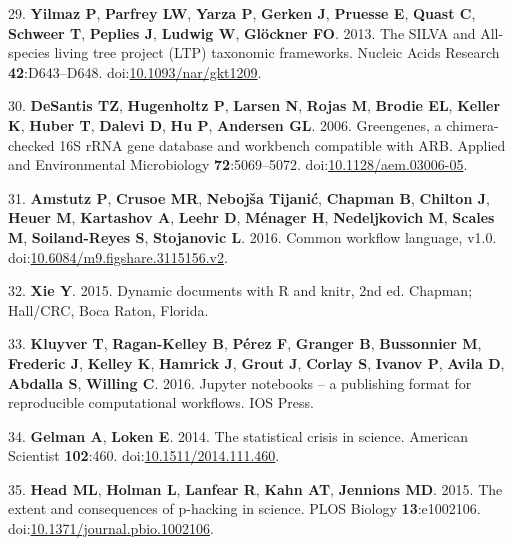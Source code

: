 \documentclass[]{article}
\begin{document}
\hypertarget{ref-Yilmaz2013}{}
29. \textbf{Yilmaz P}, \textbf{Parfrey LW}, \textbf{Yarza P},
\textbf{Gerken J}, \textbf{Pruesse E}, \textbf{Quast C}, \textbf{Schweer
T}, \textbf{Peplies J}, \textbf{Ludwig W}, \textbf{Glöckner FO}. 2013.
The SILVA and All-species living tree project (LTP) taxonomic
frameworks. Nucleic Acids Research \textbf{42}:D643--D648.
doi:\href{https://doi.org/10.1093/nar/gkt1209}{10.1093/nar/gkt1209}.

\hypertarget{ref-DeSantis2006}{}
30. \textbf{DeSantis TZ}, \textbf{Hugenholtz P}, \textbf{Larsen N},
\textbf{Rojas M}, \textbf{Brodie EL}, \textbf{Keller K}, \textbf{Huber
T}, \textbf{Dalevi D}, \textbf{Hu P}, \textbf{Andersen GL}. 2006.
Greengenes, a chimera-checked 16S rRNA gene database and workbench
compatible with ARB. Applied and Environmental Microbiology
\textbf{72}:5069--5072.
doi:\href{https://doi.org/10.1128/aem.03006-05}{10.1128/aem.03006-05}.

\hypertarget{ref-Amstutz2016}{}
31. \textbf{Amstutz P}, \textbf{Crusoe MR}, \textbf{Nebojša Tijanić},
\textbf{Chapman B}, \textbf{Chilton J}, \textbf{Heuer M},
\textbf{Kartashov A}, \textbf{Leehr D}, \textbf{Ménager H},
\textbf{Nedeljkovich M}, \textbf{Scales M}, \textbf{Soiland-Reyes S},
\textbf{Stojanovic L}. 2016. Common workflow language, v1.0.
doi:\href{https://doi.org/10.6084/m9.figshare.3115156.v2}{10.6084/m9.figshare.3115156.v2}.

\hypertarget{ref-Xie2015}{}
32. \textbf{Xie Y}. 2015. Dynamic documents with R and knitr, 2nd ed.
Chapman; Hall/CRC, Boca Raton, Florida.

\hypertarget{ref-Kluyver2016}{}
33. \textbf{Kluyver T}, \textbf{Ragan-Kelley B}, \textbf{Pérez F},
\textbf{Granger B}, \textbf{Bussonnier M}, \textbf{Frederic J},
\textbf{Kelley K}, \textbf{Hamrick J}, \textbf{Grout J}, \textbf{Corlay
S}, \textbf{Ivanov P}, \textbf{Avila D}, \textbf{Abdalla S},
\textbf{Willing C}. 2016. Jupyter notebooks -- a publishing format for
reproducible computational workflows. IOS Press.

\hypertarget{ref-Gelman2014}{}
34. \textbf{Gelman A}, \textbf{Loken E}. 2014. The statistical crisis in
science. American Scientist \textbf{102}:460.
doi:\href{https://doi.org/10.1511/2014.111.460}{10.1511/2014.111.460}.

\hypertarget{ref-Head2015}{}
35. \textbf{Head ML}, \textbf{Holman L}, \textbf{Lanfear R},
\textbf{Kahn AT}, \textbf{Jennions MD}. 2015. The extent and
consequences of p-hacking in science. PLOS Biology \textbf{13}:e1002106.
doi:\href{https://doi.org/10.1371/journal.pbio.1002106}{10.1371/journal.pbio.1002106}.
\end{document}
